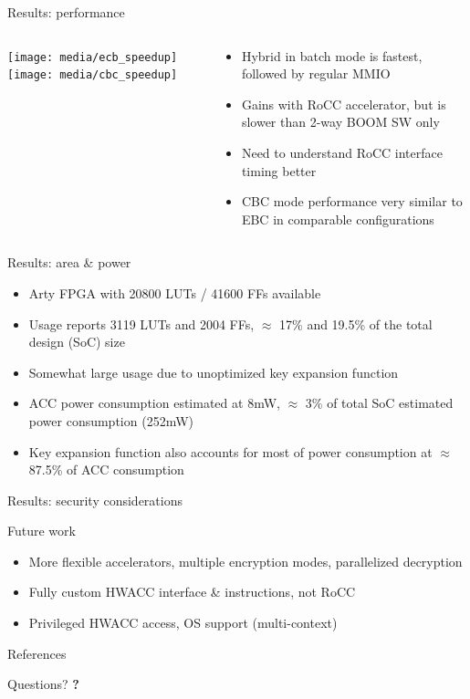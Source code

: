 \documentclass[dvipsnames]{beamer}
\begin{document}
\begin{frame}{Results: performance}
  \begin{columns}[T]
  \begin{column}{0.5\textwidth}
  \texttt{[image: media/ecb\_speedup]}
  \texttt{[image: media/cbc\_speedup]}
  \end{column}
  \begin{column}{0.5\textwidth}
  \begin{itemize}
    \item Hybrid in batch mode is fastest, followed by regular MMIO
    \item Gains with RoCC accelerator, but is slower than 2-way BOOM SW only
    \item Need to understand RoCC interface timing better
    \item CBC mode performance very similar to EBC in comparable configurations
  \end{itemize}
  \end{column}
  \end{columns}
\end{frame}

\begin{frame}{Results: area \& power}
  \begin{itemize}
  \item Arty FPGA with 20800 LUTs / 41600 FFs available
  \item Usage reports 3119 LUTs and 2004 FFs, $\approx$ 17\% and 19.5\% of the
    total design (SoC) size
  \item Somewhat large usage due to unoptimized key expansion function
  \item ACC power consumption estimated at 8mW, $\approx$ 3\% of total SoC
    estimated power consumption (252mW)
  \item Key expansion function also accounts for most of power consumption at
    $\approx$ 87.5\% of ACC consumption
  \end{itemize}
\end{frame}

\begin{frame}{Results: security considerations}
\end{frame}

\begin{frame}{Future work}
  \begin{itemize}
  \item More flexible accelerators, multiple encryption modes, parallelized decryption
  \item Fully custom HWACC interface \& instructions, not RoCC
  \item Privileged HWACC access, OS support (multi-context)
  \end{itemize}
\end{frame}

\begin{frame}{References}
\end{frame}

\begin{frame}{Questions?}
  \centering
  \huge\bfseries ?
\end{frame}
\end{document}
